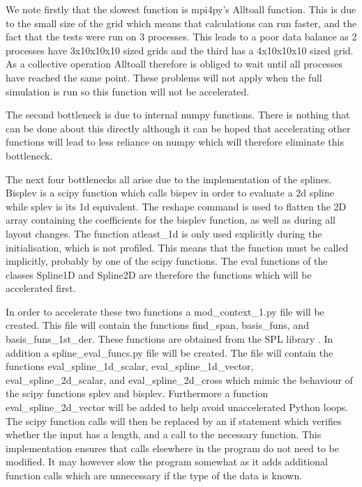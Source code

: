 We note firstly that the slowest function is mpi4py’s Alltoall function. This is due to the small size of the grid which means that calculations can run faster, and the fact that the tests were run on 3 processes. This leads to a poor data balance as 2 processes have 3x10x10x10 sized grids and the third has a 4x10x10x10 sized grid. As a collective operation Alltoall therefore is obliged to wait until all processes have reached the same point. These problems will not apply when the full simulation is run so this function will not be accelerated. 

The second bottleneck is due to internal numpy functions. There is nothing that can be done about this directly although it can be hoped that accelerating other functions will lead to less reliance on numpy which will therefore eliminate this bottleneck.

The next four bottlenecks all arise due to the implementation of the splines. Bisplev is a scipy function which calls bispev in order to evaluate a 2d spline while splev is its 1d equivalent. The reshape command is used to flatten the 2D array containing the coefficients for the bisplev function, as well as during all layout changes. The function atleast\_1d  is  only used explicitly during the initialisation, which is not profiled. This means that the function must be called implicitly,  probably by one of the scipy functions. The eval functions of the classes Spline1D and Spline2D are therefore the functions which will be accelerated first.

In order to accelerate these two functions a mod\_context\_1.py file will be created. This file will contain the functions find\_span, basis\_funs, and basis\_funs\_1st\_der. These functions are obtained from the SPL library \cite{python_spl}.  In addition a spline\_eval\_funcs.py file will be created. The file will contain the functions eval\_spline\_1d\_scalar, eval\_spline\_1d\_vector, eval\_spline\_2d\_scalar, and eval\_spline\_2d\_cross which mimic the behaviour of the scipy functions splev and bisplev. Furthermore a function eval\_spline\_2d\_vector will be added to help avoid unaccelerated Python loops. The scipy function calls will then be replaced by an if statement which verifies whether the input has a length, and a call to the necessary function. This implementation ensures that calls elsewhere in the program do not need to be modified. It may however slow the program somewhat as it adds additional function calls which are unnecessary if the type of the data is known.

